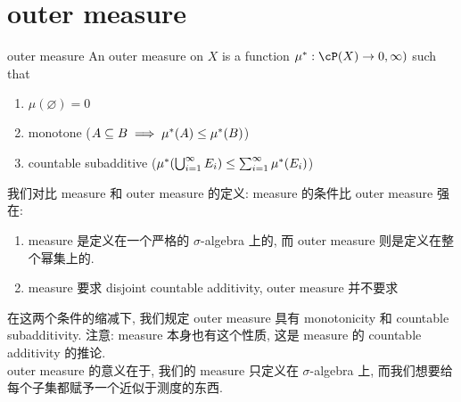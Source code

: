 \documentclass[lang=cn,11pt]{elegantbook}
\begin{document}
\section{outer measure}
\begin{definition}{outer measure}
    An outer measure on $X$ is a function $\mu^*: \cP(X) \rar {0,\infty)}$ such that
    \begin{enumerate}
        \item $\mu(\varnothing) = 0$
        \item monotone ($A \subseteq B \implies \mu^*(A) \leq \mu^*(B)$)
        \item countable subadditive ($\mu^*(\bigcup_{i=1}^\infty E_i)  \leq \sum_{i=1}^\infty \mu^*(E_i)$)
    \end{enumerate}
\end{definition}
\begin{remark}
    我们对比 measure 和 outer measure 的定义:
    measure 的条件比 outer measure 强在:
    \begin{enumerate}
        \item measure 是定义在一个严格的 $\sigma$-algebra 上的, 而 outer measure 则是定义在整个幂集上的. 
        \item measure 要求 disjoint countable additivity, outer measure 并不要求
    \end{enumerate}
\end{remark}

在这两个条件的缩减下, 我们规定 outer measure 具有 monotonicity 和 countable subadditivity. 注意: measure 本身也有这个性质, 这是 measure 的 countable additivity 的推论. \\
outer measure 的意义在于, 我们的 measure 只定义在 $\sigma$-algebra 上, 而我们想要给每个子集都赋予一个近似于测度的东西. 
\end{document}
